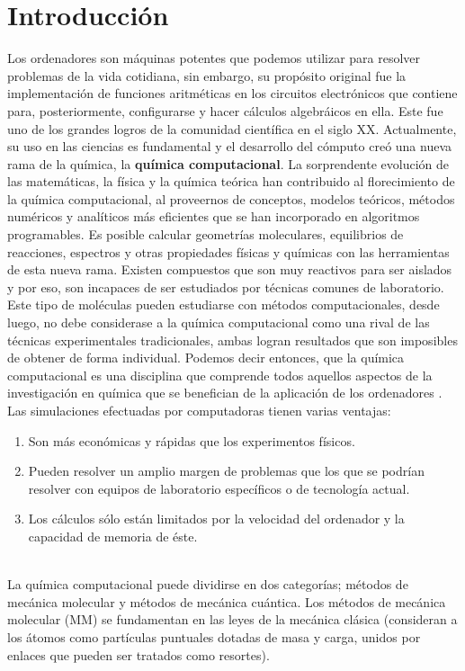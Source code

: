 \documentclass[12pt]{article}
\begin{document}
\section*{Introducción}
Los ordenadores son máquinas potentes que podemos utilizar para resolver problemas de la vida cotidiana, sin embargo, su propósito original fue la implementación de funciones aritméticas en los circuitos electrónicos que contiene para, posteriormente, configurarse y hacer cálculos algebráicos en ella. Este fue uno de los grandes logros de la comunidad científica en el siglo XX. Actualmente, su uso en las ciencias es fundamental y el desarrollo del cómputo creó una nueva rama de la química, la \textbf{química computacional}. La sorprendente evolución de las matemáticas, la física y la química teórica han contribuido al florecimiento de la química computacional, al proveernos de conceptos, modelos teóricos, métodos numéricos y analíticos más eficientes que se han incorporado en algoritmos programables. Es posible calcular geometrías moleculares, equilibrios de reacciones, espectros y otras propiedades físicas y químicas con las herramientas de esta nueva rama. Existen compuestos que son muy reactivos para ser aislados y por eso, son incapaces de ser estudiados por técnicas comunes de laboratorio. Este tipo de moléculas pueden estudiarse con métodos computacionales, desde luego, no debe considerase a la química computacional como una rival de las técnicas experimentales tradicionales, ambas logran resultados que son imposibles de obtener de forma individual. Podemos decir entonces, que la química computacional es una disciplina que comprende todos aquellos aspectos de la investigación en química que se benefician de la aplicación de los ordenadores \cite{Cuevas2003}. 
Las simulaciones efectuadas por computadoras tienen varias ventajas:
\begin{enumerate}
\item Son más económicas y rápidas que los experimentos físicos.
\item Pueden resolver un amplio margen de problemas que los que se podrían resolver con equipos de laboratorio específicos o de tecnología actual. 
\item Los cálculos sólo están limitados por la velocidad del ordenador y la capacidad de memoria de éste.
\end{enumerate}\\

La química computacional puede dividirse en dos categorías; métodos de mecánica molecular y métodos de mecánica cuántica. Los métodos de mecánica molecular (MM) se fundamentan en las leyes de la mecánica clásica (consideran a los átomos como partículas puntuales dotadas de masa y carga, unidos por enlaces que pueden ser tratados como resortes). \\
\end{document}
